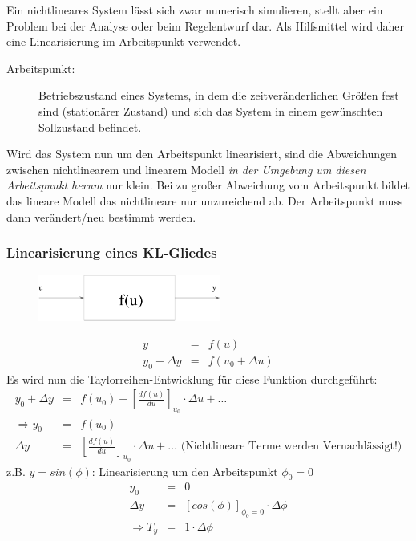\message{ !name(Mitschrieb_SysRegel.tex)}\documentclass[12pt,a4paper,ngerman]{scrartcl}
\begin{document}
Ein nichtlineares System lässt sich zwar numerisch simulieren, stellt aber ein Problem bei der Analyse oder beim Regelentwurf dar. Als Hilfsmittel wird daher eine Linearisierung im Arbeitspunkt verwendet.
\begin{description}
\item[Arbeitspunkt: ]Betriebszustand eines Systems, in dem die zeitveränderlichen Größen fest sind (stationärer Zustand) und sich das System in einem gewünschten Sollzustand befindet. 
\end{description}
Wird das System nun um den Arbeitspunkt linearisiert, sind die Abweichungen zwischen nichtlinearem und linearem Modell \emph{in der Umgebung um diesen Arbeitspunkt herum }nur klein. Bei zu großer Abweichung vom Arbeitspunkt bildet das lineare Modell das nichtlineare nur unzureichend ab. Der Arbeitspunkt muss dann verändert/neu bestimmt werden. 

\subsubsection*{Linearisierung eines KL-Gliedes}
\begin{figure}[H]
\center
  \includegraphics[width=6cm]{sysregel_klglied}
\end{figure}

\begin{eqnarray*}
  y&=&f(u) \\
y_0+ \Delta y &=& f(u_0+ \Delta u)
\end{eqnarray*}
Es wird nun die Taylorreihen-Entwicklung für diese Funktion durchgeführt:
\begin{eqnarray*}
  y_0+\Delta y &=& f(u_0) + [\frac{df(u)}{du}]_{u_0} \cdot \Delta u + \dots\\
  \Rightarrow y_0& =& f(u_0)\\ \Delta y &=&[\frac{df(u)}{du}]_{u_0} \cdot \Delta u + \dots \text{ (Nichtlineare Terme werden Vernachlässigt!)}
\end{eqnarray*}
z.B. $y=sin(\phi)$: Linearisierung um den Arbeitspunkt $\phi_0 =0$
\begin{eqnarray*}
y_0 &=& 0\\
\Delta y&=& [cos(\phi)]_{\phi_0 =0} \cdot \Delta \phi\\
\Rightarrow T_y &=& 1 \cdot \Delta \phi 
\end{eqnarray*}
\end{document}

